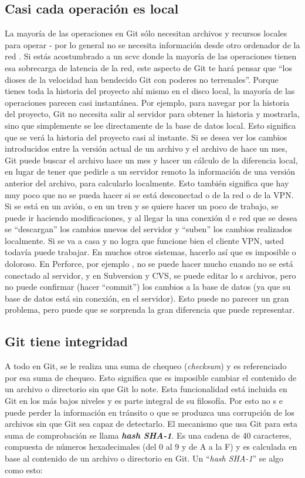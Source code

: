 \documentclass[12pt, spanish, oneside, onecolumn, a4paper]{report}
\begin{document}
\subsection{Casi cada operación es local} 
\label{sec:nearlyoperationlocal} La mayoría de las operaciones en Git sólo necesitan archivos y recursos locales para operar - por lo general no se necesita información desde otro ordenador de la red . Si estás acostumbrado a un \gls{scvc} donde la mayoría de las operaciones tienen esa sobrecarga de latencia de la red, este aspecto de Git te hará pensar que ``los dioses de la velocidad han bendecido Git con poderes no terrenales''. Porque tienes toda la historia del proyecto ahí mismo en el disco local, la mayoría de las operaciones parecen casi instantánea. Por ejemplo, para navegar por la historia del proyecto, Git no necesita salir al servidor para obtener la historia y mostrarla, sino que simplemente se lee directamente de la base de datos local. Esto significa que se verá la historia del proyecto casi al instante. Si se desea ver los cambios introducidos entre la versión actual de un archivo y el archivo de hace un mes, Git puede buscar el archivo hace un mes y hacer un cálculo de la diferencia local, en lugar de tener que pedirle a un servidor remoto la información de una versión anterior del archivo, para calcularlo localmente. Esto también significa que hay muy poco que no se pueda hacer si se está desconectad o de la red o de la VPN. Si se está en un avión, o en un tren y se quiere hacer un poco de trabajo, se puede ir haciendo modificaciones, y al llegar la una conexión d e red que se desea se ``descargan'' los cambios nuevos del servidor y ``suben'' los cambios realizados localmente. Si se va a casa y no logra que funcione bien el cliente VPN, usted todavía puede trabajar. En muchos otros sistemas, hacerlo así que es imposible o doloroso. En Perforce, por ejemplo , no se puede hacer mucho cuando no se está conectado al servidor, y en Subversion y CVS, se puede editar lo s archivos, pero no puede confirmar (hacer ``commit'') los cambios a la base de datos (ya que su base de datos está sin conexión, en el servidor). Esto puede no parecer un gran problema, pero puede que se sorprenda la gran diferencia que puede representar. 
\subsection{Git tiene integridad} 
\label{sec:githasintegrity} A todo en Git, se le realiza una suma de chequeo (\emph{checksum}) y es referenciado por esa suma de chequeo. Esto significa que es imposible cambiar el contenido de un archivo o directorio sin que Git lo note. Esta funcionalidad está incluida en Git en los más bajos niveles y es parte integral de su filosofía. Por esto no s e puede perder la información en tránsito o que se produzca una corrupción de los archivos sin que Git sea capaz de detectarlo. El mecanismo que usa Git para esta suma de comprobación se llama \emph{\textbf{hash SHA-1}}. Es una cadena de 40 caracteres, compuesta de números hexadecimales (del 0 al 9 y de A a la F) y es calculada en base al contenido de un archivo o directorio en Git. Un ``\emph{hash SHA-1}'' se algo como esto: 
\end{document}
